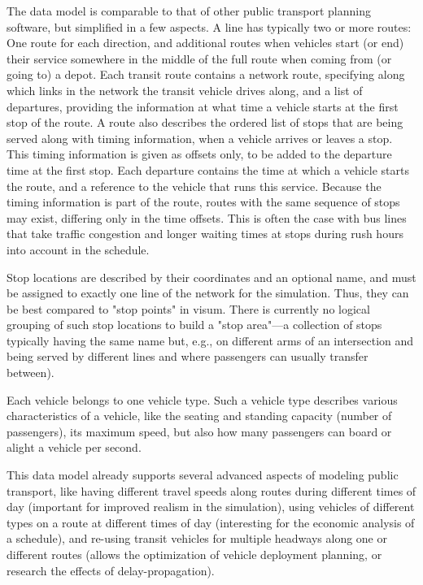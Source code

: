 The data model is comparable to that of other public transport planning
software, but simplified in a few aspects. A line has typically two or more
routes: One route for each direction, and additional routes when vehicles start
(or end) their service somewhere in the middle of the full route when coming
from (or going to) a depot. Each transit route contains a network route,
specifying along which links in the network the transit vehicle drives along,
and a list of departures, providing the information at what time a vehicle
starts at the first stop of the route. A route also describes the ordered list
of stops that are being served along with timing information, when a vehicle
arrives or leaves a stop. This timing information is given as offsets only, to
be added to the departure time at the first stop. Each departure contains the
time at which a vehicle starts the route, and a reference to the vehicle that
runs this service. Because the timing information is part of the route, routes
with the same sequence of stops may exist, differing only in the time offsets.
This is often the case with bus lines that take traffic congestion and
longer waiting times at stops during rush hours into account in the schedule. 

Stop locations are described by their coordinates and an optional name, and must
be assigned to exactly one line of the network for the simulation. Thus, they
can be best compared to "stop points" in \gls{visum}. There is currently no logical
grouping of such stop locations to build a "stop area"---a collection of
stops typically having the same name but, e.g., on different arms of an intersection and
being served by different lines and where passengers can usually transfer
between).

Each vehicle belongs to one vehicle type. Such a vehicle type describes various
characteristics of a vehicle, like the seating and standing capacity (number of
passengers), its maximum speed, but also how many passengers can board or alight
a vehicle per second.

This data model already supports several advanced aspects of modeling public
transport, like having different travel speeds along routes during different
times of day (important for improved realism in the simulation), using vehicles
of different types on a route at different times of day (interesting for the
economic analysis of a schedule), and re-using transit vehicles for multiple
headways along one or different routes (allows the optimization of vehicle
deployment planning, or research the effects of delay-propagation).


